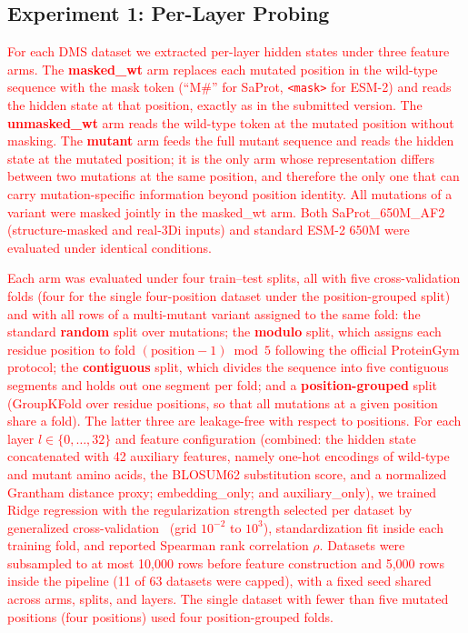 \documentclass[11pt,a4paper]{article}
\newcommand{\revised}[1]{\textcolor{red}{#1}}
\begin{document}
\subsection{Experiment 1: Per-Layer Probing}

\revised{For each DMS dataset we extracted per-layer hidden states under three feature
arms. The \textbf{masked\_wt} arm replaces each mutated position in the wild-type
sequence with the mask token (``M\#'' for SaProt, \texttt{<mask>} for ESM-2) and reads
the hidden state at that position, exactly as in the submitted version. The
\textbf{unmasked\_wt} arm reads the wild-type token at the mutated position without
masking. The \textbf{mutant} arm feeds the full mutant sequence and reads the hidden
state at the mutated position; it is the only arm whose representation differs between
two mutations at the same position, and therefore the only one that can carry
mutation-specific information beyond position identity. All mutations of a variant
were masked jointly in the masked\_wt arm. Both SaProt\_650M\_AF2 (structure-masked
and real-3Di inputs) and standard ESM-2 650M were evaluated under identical conditions.}

\revised{Each arm was evaluated under four train--test splits, all with five
cross-validation folds (four for the single four-position dataset under the
position-grouped split) and with all rows of a multi-mutant variant assigned to the
same fold: the standard \textbf{random} split over mutations; the \textbf{modulo}
split, which assigns each residue position to fold $(\text{position} - 1) \bmod 5$
following the official ProteinGym protocol; the \textbf{contiguous} split, which
divides the sequence into five contiguous segments and holds out one segment per
fold; and a \textbf{position-grouped} split (GroupKFold over residue positions, so
that all mutations at a given position share a fold). The latter three are
leakage-free with respect to positions. For each layer $l \in \{0,\dots,32\}$ and
feature configuration (combined: the hidden state concatenated with 42 auxiliary
features, namely one-hot encodings of wild-type and mutant amino acids, the BLOSUM62
substitution score, and a normalized Grantham distance proxy; embedding\_only; and
auxiliary\_only), we trained Ridge regression with the regularization strength
selected per dataset by generalized cross-validation~\cite{golub1979generalized}
(grid $10^{-2}$ to $10^{3}$), standardization fit inside each training fold, and
reported Spearman rank correlation $\rho$. Datasets were subsampled to at most 10,000
rows before feature construction and 5,000 rows inside the pipeline (11 of 63 datasets
were capped), with a fixed seed shared across arms, splits, and layers. The single
dataset with fewer than five mutated positions (four positions) used four
position-grouped folds.}
\end{document}
